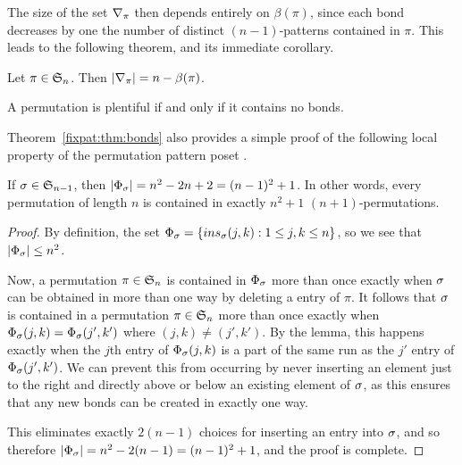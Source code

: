     The size of the set $\delpi$ then depends entirely on $\beta(\pi)$, since
    each bond decreases by one the number of distinct $(n-1)$-patterns
    contained in $\pi$. This leads to the following theorem, and its immediate
    corollary. 

    \begin{theorem} \label{fixpat:thm:bonds}
      Let $\pi \in \S_n$. Then $|\delpi| = n - \beta(\pi)$. 
    \end{theorem}

    \begin{corollary} \label{fixpat:cor:alldistinct}
      A permutation is plentiful if and only if it contains no bonds. 
    \end{corollary}

    Theorem~\ref{fixpat:thm:bonds} also provides a simple proof of the
    following local property of the permutation pattern poset . 

    \begin{corollary} \label{fixpat:cor:n2+1} 
      If $\sg \in \S_{n-1}$, then $|\ins_\sg| = n^2 - 2n + 2 = (n-1)^2 + 1$. In
      other words, every permutation of length $n$ is contained in exactly $n^2 +1$
      $(n+1)$-permutations. 
    \end{corollary}
    \begin{proof}

      By definition, the set $\ins_\sg = \{ins_\sg(j,k) : 1 \leq j , k \leq
      n\}$, so we see that $|\ins_\sg| \leq n^2$.

      Now, a permutation $\pi \in \S_n$ is contained in $\ins_\sg$ more than once
      exactly when $\sg$ can be obtained in more than one way by deleting a entry
      of $\pi$. It follows that $\sg$ is contained in a permutation $\pi \in \S_n$
      more than once exactly when $\ins_\sg(j,k) = \ins_\sg(j',k')$ where
      $(j,k) \neq (j',k')$. By the lemma, this happens exactly when the $j$th
      entry of
      $\ins_\sg(j,k)$ is a part of the same run as the $j'$ entry of
      $\ins_\sg(j',k')$. We can prevent this from occurring by never inserting
      an element just to the right and directly above or below an existing
      element of $\sg$, as this ensures that any new bonds can be created in
      exactly one way. 

      This eliminates exactly $2(n-1)$ choices for inserting an entry into $\sg$,
      and so therefore $|\ins_\sg| = n^2 - 2(n-1) = (n-1)^2 +1$, and the proof
      is complete.  
    \end{proof}

